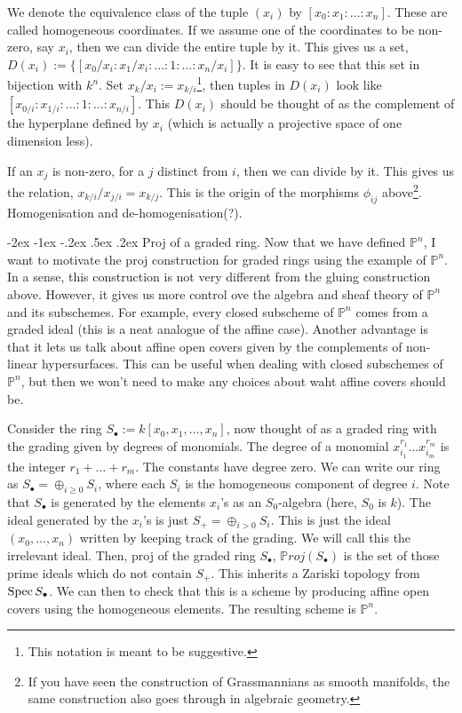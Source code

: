 \documentclass[11pt]{amsart}
\makeatletter
\renewcommand\subsection{\@startsection {subsection}{1}{\z@}%
	{-2ex \@plus -1ex \@minus -.2ex}%
	{.5ex \@plus.2ex}%
	{\normalfont\bfseries}}
\newcommand{\Proj}{{\P roj}}
\newcommand{\Spec}{{\rm Spec \,}}
\renewcommand{\P}{{\mathbb P}}
\theoremstyle{definition}
\makeatother
\begin{document}
We denote the equivalence class of the tuple $(x_i)$ by $[x_0:x_1:\ldots:x_n]$. These are called homogeneous coordinates. If we assume one of the coordinates to be non-zero, say $x_i$, then we can divide the entire tuple by it. This gives us a set, $D(x_i):=\lbrace [x_0/x_i:x_1/x_i:\ldots:1:\ldots:x_n/x_i]\rbrace$. It is easy to see that this set in bijection with $k^n$. Set $x_k/x_i:=x_{k/i}$\footnote{This notation is meant to be suggestive.}, then tuples in $D(x_i)$ look like $[x_{0/i}:x_{1/i}:\ldots:1:\ldots:x_{n/i}]$. This $D(x_i)$ should be thought of as the complement of the hyperplane defined by $x_i$ (which is actually a projective space of one dimension less). 

If an $x_j$ is non-zero, for a $j$ distinct from $i$, then we can divide by it. This gives us the relation, $x_{k/i}/x_{j/i}=x_{k/j}$. This is the origin of the morphisms $\phi_{ij}$ above\footnote{If you have seen the construction of Grassmannians as smooth manifolds, the same construction also goes through in algebraic geometry.}. Homogenisation and de-homogenisation(?).


\subsection{Proj of a graded ring.}\label{subsection-proj-construction}
Now that we have defined $\P^n$, I want to motivate the proj construction for graded rings using the example of $\P^n$. In a sense, this construction is not very different from the gluing construction above. However, it gives us more control ove the algebra and sheaf theory of $\P^n$ and its subschemes. For example, every closed subscheme of $\P^n$ comes from a graded ideal (this is a neat analogue of the affine case). Another advantage is that it lets us talk about affine open covers given by the complements of non-linear hypersurfaces. This can be useful when dealing with closed subschemes of $\P^n$, but then we won't need to make any choices about waht affine covers should be. 

Consider the ring $S_{\bullet}:=k[x_0,x_1,\ldots,x_n]$, now thought of as a graded ring with the grading given by degrees of monomials. The degree of a monomial $x^{r_1}_{i_1}\ldots x^{r_m}_{i_m}$ is the integer $r_1+\ldots +r_m$. The constants have degree zero. We can write our ring as $S_{\bullet}=\oplus_{i\geq 0}S_i$, where each $S_i$ is the homogeneous component of degree $i$. Note that $S_{\bullet}$ is generated by the elements $x_i$'s as an $S_0$-algebra (here, $S_0$ is $k$). The ideal generated by the $x_i$'s is just $S_{+}=\oplus_{i>0}S_i$. This is just the ideal $(x_0,\ldots,x_n)$ written by keeping track of the grading. We will call this the irrelevant ideal. Then, proj of the graded ring $S_{\bullet}$, $\Proj(S_{\bullet})$ is the set of those  prime ideals which do not contain $S_+$. This inherits a Zariski topology from $\Spec S_{\bullet}$. We can then to check that this is a scheme by producing affine open covers using the homogeneous elements. The resulting scheme is $\P^n$.
\end{document}
